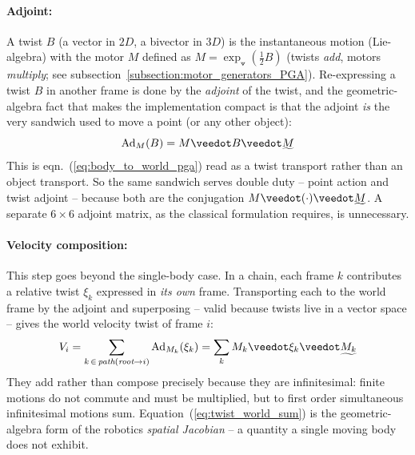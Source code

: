 \paragraph{Adjoint:} A twist $B$ (a vector in $2D$, a bivector in $3D$) is the
instantaneous motion (Lie-algebra) with the motor $M$ defined as $M =
\exp_\veedot(\tfrac12 B)$ (twists \emph{add}, motors \emph{multiply}; see
subsection~\ref{subsection:motor_generators_PGA}). Re-expressing a twist $B$ in another
frame is done by the \emph{adjoint} of the twist, and the geometric-algebra fact that
makes the implementation compact is that the adjoint \emph{is} the very sandwich used to
move a point (or any other object):
\begin{equation}
    \mathrm{Ad}_M(B) = M \veedot B \veedot \rrev{M}
    \label{eq:adjoint_is_sandwich}
\end{equation}
This is eqn.~(\ref{eq:body_to_world_pga}) read as a twist transport rather than an object
transport. So the same sandwich serves double duty -- point action and twist adjoint --
because both are the conjugation $M\veedot(\cdot)\veedot\rrev{M}$. A separate $6\times6$
adjoint matrix, as the classical formulation requires, is unnecessary.

\paragraph{Velocity composition:} This step goes beyond the single-body case. In a chain,
each frame $k$
contributes a relative twist $\xi_k$ expressed in \emph{its own} frame. Transporting each
to the world frame by the adjoint and superposing -- valid because twists live in a vector
space -- gives the world velocity twist of frame $i$:
\begin{equation}
    V_i = \sum_{k \,\in\, \textit{path}(\textit{root} \to i)} \mathrm{Ad}_{M_k}(\xi_k)
        = \sum_k M_k \veedot \xi_k \veedot \rrev{M_k}
    \label{eq:twist_world_sum}
\end{equation}
They add rather than compose precisely because they are infinitesimal: finite motions do
not commute and must be multiplied, but to first order simultaneous infinitesimal motions
sum. Equation~(\ref{eq:twist_world_sum}) is the geometric-algebra form of the robotics
\emph{spatial Jacobian} -- a quantity a single moving body does not exhibit.

